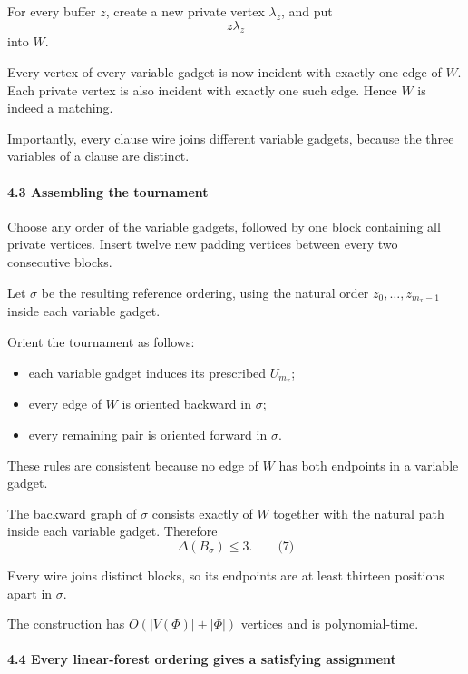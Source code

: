 \documentclass[
  11pt,
  a4paper,
]{article}
\providecommand{\tightlist}{%
  \setlength{\itemsep}{0pt}\setlength{\parskip}{0pt}}
\begin{document}
For every buffer \(z\), create a new private vertex \(\lambda_z\), and
put \[
z\lambda_z
\] into \(W\).

Every vertex of every variable gadget is now incident with exactly one
edge of \(W\). Each private vertex is also incident with exactly one
such edge. Hence \(W\) is indeed a matching.

Importantly, every clause wire joins different variable gadgets, because
the three variables of a clause are distinct.

\paragraph{4.3 Assembling the
tournament}\label{assembling-the-tournament}

Choose any order of the variable gadgets, followed by one block
containing all private vertices. Insert twelve new padding vertices
between every two consecutive blocks.

Let \(\sigma\) be the resulting reference ordering, using the natural
order \(z_0,\ldots,z_{m_x-1}\) inside each variable gadget.

Orient the tournament as follows:

\begin{itemize}
\tightlist
\item
  each variable gadget induces its prescribed \(U_{m_x}\);
\item
  every edge of \(W\) is oriented backward in \(\sigma\);
\item
  every remaining pair is oriented forward in \(\sigma\).
\end{itemize}

These rules are consistent because no edge of \(W\) has both endpoints
in a variable gadget.

The backward graph of \(\sigma\) consists exactly of \(W\) together with
the natural path inside each variable gadget. Therefore \[
\Delta(B_\sigma)\le3. \qquad\text{(7)}
\]

Every wire joins distinct blocks, so its endpoints are at least thirteen
positions apart in \(\sigma\).

The construction has \(O(|V(\Phi)|+|\Phi|)\) vertices and is
polynomial-time.

\paragraph{4.4 Every linear-forest ordering gives a satisfying
assignment}\label{every-linear-forest-ordering-gives-a-satisfying-assignment}
\end{document}

